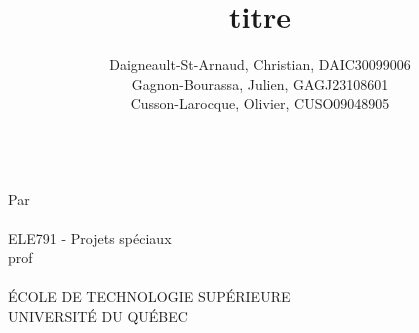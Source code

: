 

\title{titre}
\author{
	Daigneault-St-Arnaud, Christian, DAIC30099006 \\
	Gagnon-Bourassa, Julien, GAGJ23108601 \\
	Cusson-Larocque, Olivier, CUSO09048905
}
\newcommand{\cours}{ELE791 - Projets sp\'{e}ciaux }
\newcommand{\prof}{prof}



\makeatletter
\begin{titlepage}
	\begin{center}
	{\Huge \@title}\\ 
	\vspace{3cm}
	{\large Par \\
		\vspace{0.5cm}
		\@author \\
		\vspace{3cm}
		\cours \\
		\vspace{0.5cm}
		\prof \\
		\vspace{3.5cm}
		\@date \\
		\vspace{3.5cm}
		\'{E}COLE DE TECHNOLOGIE SUP\'{E}RIEURE \\
		UNIVERSIT\'{E} DU QUÉBEC
	}		
	\end{center}
\end{titlepage}
\makeatother




